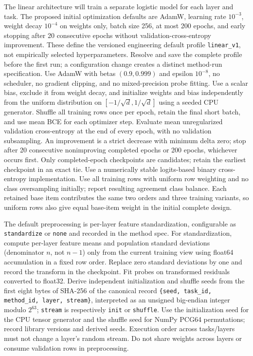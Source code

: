 \documentclass[11pt]{article}
\begin{document}
The linear architecture will train a separate logistic model for each layer and task.
The proposed initial optimization defaults are AdamW, learning rate $10^{-3}$, weight decay $10^{-4}$ on weights only, batch size 256, at most 200 epochs, and early stopping after 20 consecutive epochs without validation-cross-entropy improvement.
These define the versioned engineering default profile \texttt{linear\_v1}, not empirically selected hyperparameters.
Resolve and save the complete profile before the first run; a configuration change creates a distinct method-run specification.
Use AdamW with betas $(0.9,0.999)$ and epsilon $10^{-8}$, no scheduler, no gradient clipping, and no mixed-precision probe fitting.
Use a scalar bias, exclude it from weight decay, and initialize weights and bias independently from the uniform distribution on $[-1/\sqrt d,1/\sqrt d]$ using a seeded CPU generator.
Shuffle all training rows once per epoch, retain the final short batch, and use mean BCE for each optimizer step.
Evaluate mean unregularized validation cross-entropy at the end of every epoch, with no validation subsampling.
An improvement is a strict decrease with minimum delta zero; stop after 20 consecutive nonimproving completed epochs or 200 epochs, whichever occurs first.
Only completed-epoch checkpoints are candidates; retain the earliest checkpoint in an exact tie.
Use a numerically stable logits-based binary cross-entropy implementation.
Use all training rows with uniform row weighting and no class oversampling initially; report resulting agreement class balance.
Each retained base item contributes the same two orders and three training variants, so uniform rows also give equal base-item weight in the initial complete design.

The default preprocessing is per-layer feature standardization, configurable as \texttt{standardize} or \texttt{none} and recorded in the method spec.
For standardization, compute per-layer feature means and population standard deviations (denominator $n$, not $n-1$) only from the current training view using float64 accumulation in a fixed row order.
Replace zero standard deviations by one and record the transform in the checkpoint.
Fit probes on transformed residuals converted to float32.
Derive independent initialization and shuffle seeds from the first eight bytes of SHA-256 of the canonical record \texttt{\{seed, task\_id, method\_id, layer, stream\}}, interpreted as an unsigned big-endian integer modulo $2^{63}$; \texttt{stream} is respectively \texttt{init} or \texttt{shuffle}.
Use the initialization seed for the CPU tensor generator and the shuffle seed for NumPy PCG64 permutations; record library versions and derived seeds.
Execution order across tasks/layers must not change a layer's random stream.
Do not share weights across layers or consume validation rows in preprocessing.
\end{document}
